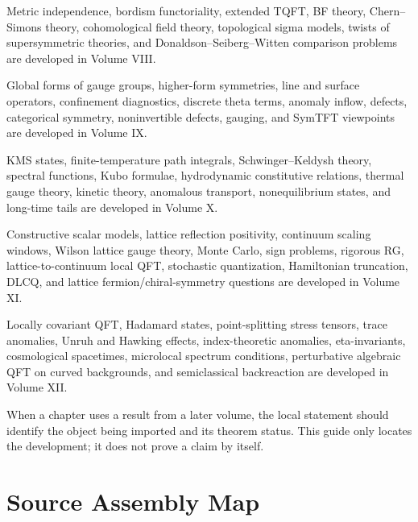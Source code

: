 \begin{description}[leftmargin=2.7em,style=nextline]
\item[Topological and cohomological theories]
Metric independence, bordism functoriality, extended TQFT, BF theory,
Chern--Simons theory, cohomological field theory, topological sigma models,
twists of supersymmetric theories, and Donaldson--Seiberg--Witten comparison
problems are developed in Volume VIII.

\item[Global structure and generalized symmetry]
Global forms of gauge groups, higher-form symmetries, line and surface
operators, confinement diagnostics, discrete theta terms, anomaly inflow,
defects, categorical symmetry, noninvertible defects, gauging, and SymTFT
viewpoints are developed in Volume IX.

\item[Thermal and hydrodynamic QFT]
KMS states, finite-temperature path integrals, Schwinger--Keldysh theory,
spectral functions, Kubo formulae, hydrodynamic constitutive relations,
thermal gauge theory, kinetic theory, anomalous transport, nonequilibrium
states, and long-time tails are developed in Volume X.

\item[Constructive, lattice, and numerical routes]
Constructive scalar models, lattice reflection positivity, continuum scaling
windows, Wilson lattice gauge theory, Monte Carlo, sign problems, rigorous RG,
lattice-to-continuum local QFT, stochastic quantization, Hamiltonian
truncation, DLCQ, and lattice fermion/chiral-symmetry questions are developed
in Volume XI.

\item[Curved backgrounds]
Locally covariant QFT, Hadamard states, point-splitting stress tensors, trace
anomalies, Unruh and Hawking effects, index-theoretic anomalies,
eta-invariants, cosmological spacetimes, microlocal spectrum conditions,
perturbative algebraic QFT on curved backgrounds, and semiclassical
backreaction are developed in Volume XII.
\end{description}

When a chapter uses a result from a later volume, the local statement should
identify the object being imported and its theorem status.  This guide only
locates the development; it does not prove a claim by itself.

\section*{Source Assembly Map}


